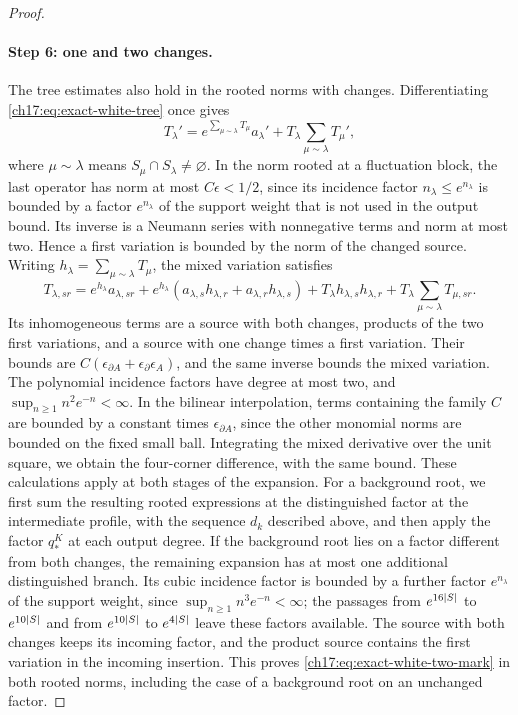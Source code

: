 \begin{proof}
\paragraph{Step 6: one and two changes.}
The tree estimates also hold in the rooted norms with changes. Differentiating \eqref{ch17:eq:exact-white-tree} once gives
\[
 T_\lambda'=e^{\sum_{\mu\sim\lambda}T_\mu}a_\lambda'+T_\lambda\sum_{\mu\sim\lambda}T_\mu',
\]
where $\mu\sim\lambda$ means $S_\mu\cap S_\lambda\ne\varnothing$. In the norm rooted at a fluctuation block, the last operator has norm at most $C\epsilon<1/2$, since its incidence factor $n_\lambda\le e^{n_\lambda}$ is bounded by a factor $e^{n_\lambda}$ of the support weight that is not used in the output bound. Its inverse is a Neumann series with nonnegative terms and norm at most two. Hence a first variation is bounded by the norm of the changed source. Writing $h_\lambda=\sum_{\mu\sim\lambda}T_\mu$, the mixed variation satisfies
\[
 T_{\lambda,sr}=e^{h_\lambda}a_{\lambda,sr}+e^{h_\lambda}(a_{\lambda,s}h_{\lambda,r}+a_{\lambda,r}h_{\lambda,s})+T_\lambda h_{\lambda,s}h_{\lambda,r}+T_\lambda\sum_{\mu\sim\lambda}T_{\mu,sr}.
\]
Its inhomogeneous terms are a source with both changes, products of the two first variations, and a source with one change times a first variation. Their bounds are $C(\epsilon_{\partial A}+\epsilon_\partial\epsilon_A)$, and the same inverse bounds the mixed variation. The polynomial incidence factors have degree at most two, and $\sup_{n\ge1}n^2e^{-n}<\infty$. In the bilinear interpolation, terms containing the family $C$ are bounded by a constant times $\epsilon_{\partial A}$, since the other monomial norms are bounded on the fixed small ball. Integrating the mixed derivative over the unit square, we obtain the four-corner difference, with the same bound. These calculations apply at both stages of the expansion. For a background root, we first sum the resulting rooted expressions at the distinguished factor at the intermediate profile, with the sequence $d_k$ described above, and then apply the factor $q_*^K$ at each output degree. If the background root lies on a factor different from both changes, the remaining expansion has at most one additional distinguished branch. Its cubic incidence factor is bounded by a further factor $e^{n_\lambda}$ of the support weight, since $\sup_{n\ge1}n^3e^{-n}<\infty$; the passages from $e^{16\lvert S\rvert}$ to $e^{10\lvert S\rvert}$ and from $e^{10\lvert S\rvert}$ to $e^{4\lvert S\rvert}$ leave these factors available. The source with both changes keeps its incoming factor, and the product source contains the first variation in the incoming insertion. This proves \eqref{ch17:eq:exact-white-two-mark} in both rooted norms, including the case of a background root on an unchanged factor.


\end{proof}
